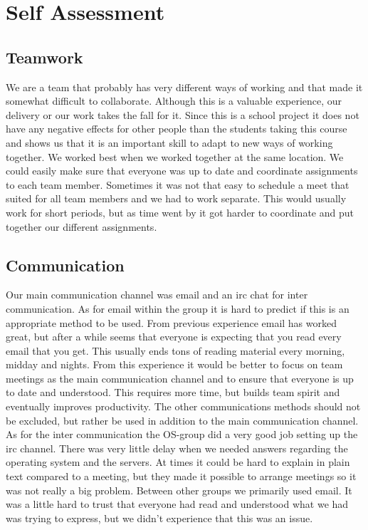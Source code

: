 \section{Self Assessment}
\subsection{Teamwork}
We are a team that probably has very different ways of working and that made it somewhat difficult to collaborate. Although this is a valuable experience, our delivery or our work takes the fall for it. Since this is a school project it does not have any negative effects for other people than the students taking this course and shows us that it is an important skill to adapt to new ways of working together. We worked best when we worked together at the same location. We could easily make sure that everyone was up to date and coordinate assignments to each team member. Sometimes it was not that easy to schedule a meet that suited for all team members and we had to work separate. This would usually work for short periods, but as time went by it got harder to coordinate and put together our different assignments. 
\subsection{Communication}
Our main communication channel was email and an irc chat for inter communication. As for email within the group it is hard to predict if this is an appropriate method to be used. From previous experience email has worked great, but after a while seems that everyone is expecting that you read every email that you get. This usually ends tons of reading material every morning, midday and nights. From this experience it would be better to focus on team meetings as the main communication channel and to ensure that everyone is up to date and understood. This requires more time, but builds team spirit and eventually improves productivity. The other communications methods should not be excluded, but rather be used in addition to the main communication channel. As for the inter communication the OS-group did a very good job setting up the irc channel. There was very little delay when we needed answers regarding the operating system and the servers. At times it could be hard to explain in plain text compared to a meeting, but they made it possible to arrange meetings so it was not really a big problem. Between other groups we primarily used email. It was a little hard to trust that everyone had read and understood what we had was trying to express, but we didn’t experience that this was an issue. 
